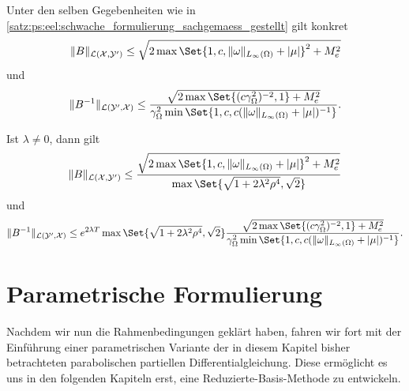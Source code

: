 \begin{Korollar}
\label{kor:ps:eel:schwache_formulierung_operator_schranken}
    Unter den selben Gegebenheiten wie in \cref{satz:ps:eel:schwache_formulierung_sachgemaess_gestellt} gilt konkret
    \begin{equation}
        \norm{B}_{\mathcal L(\mathcal X, \mathcal Y')} \leq \sqrt{2 \max\Set{1, c, \norm{\omega}_{L_{\infty}(\Omega)} + \abs{\mu}}^{2} + M_{e}^{2}}
    \end{equation}
    und
    \begin{equation}
        \norm{B^{-1}}_{\mathcal L(\mathcal Y', \mathcal X)} \leq \frac{\sqrt{2 \max \Set{(c \gamma_{\Omega}^{2})^{-2}, 1} + M_{e}^{2}}}{\gamma_{\Omega}^{2} \min\Set{1, c , c  (\norm{\omega}_{L_{\infty}(\Omega)} + \abs{\mu})^{-1}}}.
    \end{equation}

    Ist $\lambda \neq 0$, dann gilt
    \begin{equation}
        \norm{B}_{\mathcal L(\mathcal X, \mathcal Y')} \leq \frac{\sqrt{2 \max\Set{1, c, \norm{\omega}_{L_{\infty}(\Omega)} + \abs{\mu}}^{2} + M_{e}^{2}}}{\max\Set{\sqrt{1 + 2 \lambda^{2} \rho^{4}}, \sqrt{2}}}
    \end{equation}
    und
    \begin{equation}
        \norm{B^{-1}}_{\mathcal L(\mathcal Y', \mathcal X)} \leq e^{2 \lambda T} \max\Set{\sqrt{1 + 2 \lambda^{2} \rho^{4}}, \sqrt{2}} \frac{\sqrt{2 \max \Set{(c \gamma_{\Omega}^{2})^{-2}, 1} + M_{e}^{2}}}{\gamma_{\Omega}^{2} \min\Set{1, c , c  (\norm{\omega}_{L_{\infty}(\Omega)} + \abs{\mu})^{-1}}}.
    \end{equation}
\end{Korollar}



\section{Parametrische Formulierung} %
\label{sec:ps:pf:parametrische_formulierung}

Nachdem wir nun die Rahmenbedingungen geklärt haben, fahren wir fort mit der Einführung einer parametrischen Variante der in diesem Kapitel bisher betrachteten parabolischen partiellen Differentialgleichung.
Diese ermöglicht es uns in den folgenden Kapiteln erst, eine Reduzierte-Basis-Methode zu entwickeln.

